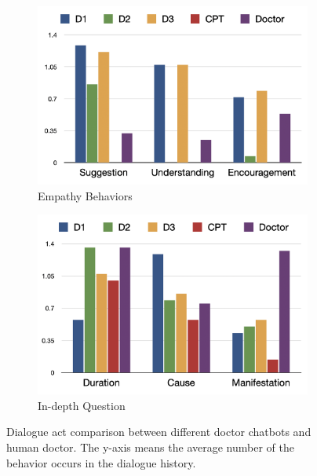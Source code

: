 

\begin{figure}[th]
 	\centering
	\begin{subfigure}{0.36\linewidth}
		\centering
		\includegraphics[width=\linewidth]{Figures/empathy.png}
		\caption{Empathy Behaviors}
		\label{fig:emp_simu_doctor}%
	\end{subfigure}
	\centering
	\begin{subfigure}{0.36\linewidth}
		\centering
		\includegraphics[width=\linewidth]{Figures/indepth.png}
		\caption{In-depth Question} 
		\label{fig:indepth_simu_doctor}%
	\end{subfigure}
	\caption{Dialogue act comparison between different doctor chatbots and human doctor. The y-axis means the average number of the behavior occurs in the dialogue history.
 }
	\label{fig:doctor_chatbot_statistics}
\end{figure}

